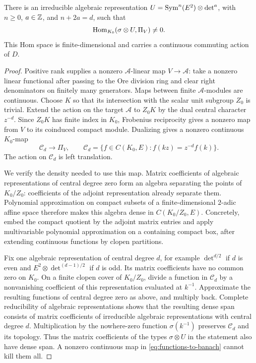 \begin{lemma}\label{lem:type-capture}
There is an irreducible algebraic representation
$U=\operatorname{Sym}^n(E^2)\otimes\det^a$, with $n\geq0$, $a\in\mathbb Z$, and
$n+2a=d$, such that
\[
                  \operatorname{Hom}_{K_0}(\sigma\otimes U,\Pi_V)\ne0.
\]
This Hom space is finite-dimensional and carries a continuous
commuting action of $D$.
\end{lemma}
\begin{proof}
Positive rank supplies a nonzero $\mathscr A$-linear map
$V\to\mathscr A$: take a nonzero linear functional after passing
to the Ore division ring and clear right denominators on finitely
many generators.  Maps between finite $\mathscr A$-modules are
continuous.  Choose $K$ so that its intersection with the scalar
unit subgroup $Z_0$ is trivial.  Extend the action on the target
$\mathscr A$ to $Z_0K$ by the dual central character $z^{-d}$.
Since $Z_0K$ has finite index in $K_0$, Frobenius reciprocity gives
a nonzero map from $V$ to its coinduced compact module.  Dualizing
gives a nonzero continuous $K_0$-map
\begin{equation}\label{eq:functions-to-banach}
 \mathcal C_d\longrightarrow\Pi_V,
 \qquad
 \mathcal C_d=\{f\in C(K_0,E):f(kz)=z^{-d}f(k)\}.
\end{equation}
The action on $\mathcal C_d$ is left translation.

We verify the density needed to use this map.  Matrix coefficients
of algebraic representations of central degree zero form an
algebra separating the points of $K_0/Z_0$: coefficients of the
adjoint representation already separate them.  Polynomial
approximation on compact subsets of a finite-dimensional
$2$-adic affine space therefore makes this algebra dense in
$C(K_0/Z_0,E)$.  Concretely, embed the compact quotient by the
adjoint matrix entries and apply multivariable polynomial
approximation on a containing compact box, after extending
continuous functions by clopen partitions.

Fix one algebraic representation of central degree $d$, for example
$\det^{d/2}$ if $d$ is even and $E^2\otimes\det^{(d-1)/2}$ if $d$
is odd.  Its matrix coefficients have no common zero on $K_0$.
On a finite clopen cover of $K_0/Z_0$, divide a function in
$\mathcal C_d$ by a nonvanishing coefficient of this representation
evaluated at $k^{-1}$.  Approximate the resulting functions of central
degree zero as above, and multiply back.  Complete reducibility of
algebraic representations shows that the resulting dense span consists
of matrix coefficients of irreducible algebraic representations with
central degree $d$.  Multiplication by the nowhere-zero function
$\sigma(k^{-1})$ preserves $\mathcal C_d$ and its topology.  Thus
the matrix coefficients of the types $\sigma\otimes U$ in the
statement also have dense span.  A nonzero continuous map in
\eqref{eq:functions-to-banach} cannot kill them all.


\end{proof}

